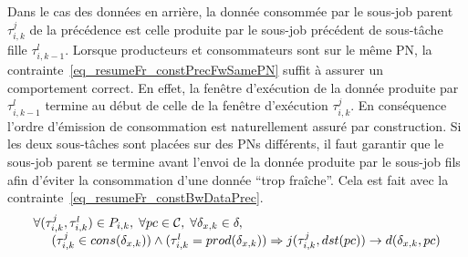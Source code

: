 \documentclass[main.tex]{subfiles}
\begin{document}
\begin{description}
        Dans le cas des données en arrière, la donnée consommée par le sous-job parent $\tau_{i,k}^j$ de la précédence est celle produite par le sous-job précédent de sous-tâche fille $\tau_{i,k-1}^l$. Lorsque producteurs et consommateurs sont sur le même PN, la contrainte~\ref{eq_resumeFr_constPrecFwSamePN} suffit à assurer un comportement correct. En effet, la fenêtre d'exécution de la donnée produite par $\tau_{i,k-1}^l$ termine au début de celle de la fenêtre d'exécution $\tau_{i,k}^j$. En conséquence l'ordre d'émission de consommation est naturellement assuré par construction. Si les deux sous-tâches sont placées sur des PNs différents, il faut garantir que le sous-job parent se termine avant l'envoi de la donnée produite par le sous-job fils afin d'éviter la consommation d'une donnée ``trop fraîche''. Cela est fait avec la contrainte~\ref{eq_resumeFr_constBwDataPrec}.
\begin{equation}
    \label{eq_resumeFr_constBwDataPrec}
    \begin{array}{l}
        \forall (\tau_{i,k}^j , \tau_{i,k}^l) \in P_{i,k}, \; \forall pc \in \mathcal{C} , \; \forall \delta_{x,k} \in \delta , \;  \\
        \hspace{5mm} (\tau_{i,k}^j \in cons(\delta_{x,k})) \land (\tau_{i,k}^l = prod(\delta_{x,k}))
        \Rightarrow j(\tau_{i,k}^j , dst(pc)) \to d( \delta_{x,k} , pc )  
    \end{array}
\end{equation}


\end{description}
\end{document}

